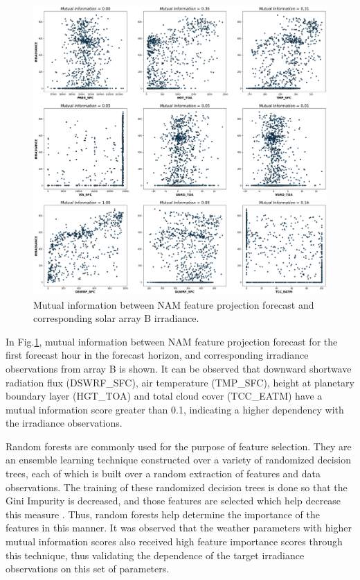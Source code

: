 \begin{figure}[htbp]
    \begin{center}
    	\includegraphics[width=\textwidth]{chapter3/fig_mi_ugabpoa1irr.png}
    	\caption[Mutual information between NAM feature projection forecast and corresponding solar array B irradiance]{Mutual information between NAM feature projection forecast and corresponding solar array B irradiance.}
    	\label{fig:fig_mi_forecast_target_hr1}
    \end{center}
\end{figure}

In Fig.\ref{fig:fig_mi_forecast_target_hr1}, mutual information between NAM feature projection forecast for the first forecast hour in the forecast horizon, and corresponding irradiance observations from array B is shown. It can be observed that downward shortwave radiation flux (DSWRF\_SFC), air temperature (TMP\_SFC), height at planetary boundary layer (HGT\_TOA) and total cloud cover (TCC\_EATM) have a mutual information score greater than 0.1, indicating a higher dependency with the irradiance observations. 

\par Random forests are commonly used for the purpose of feature selection. They are an ensemble learning technique constructed over a variety of randomized decision trees, each of which is built over a random extraction of features and data observations. The training of these randomized decision trees is done so that the Gini Impurity is decreased, and those features are selected which help decrease this measure \cite{feature_selection_rf}. Thus, random forests help determine the importance of the features in this manner. It was observed that the weather parameters with higher mutual information scores also received high feature importance scores through this technique, thus validating the dependence of the target irradiance observations on this set of parameters.

